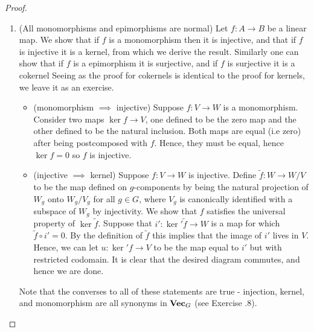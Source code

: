 \documentclass{article}
\theoremstyle{definition}
\numberwithin{figure}{section}
\begin{document}
\begin{proof}
\begin{enumerate}
\item (All monomorphisms and epimorphisms are normal) Let $f:A\to B$ be a linear map. We show that if $f$ is a monomorphism then it is injective, and that if $f$ is injective it is a kernel, from which we derive the result. Similarly one can show that if $f$ is a epimorphism it is surjective, and if $f$ is surjective it is a cokernel Seeing as the proof for cokernels is identical to the proof for kernels, we leave it as an exercise.

\begin{itemize}
\item (monomorphism $\implies$ injective) Suppose $f:V\to W$ is a monomorphism. Consider two maps $\ker f\to V$, one defined to be the zero map and the other defined to be the natural inclusion. Both maps are equal (i.e zero) after being postcomposed with $f$. Hence, they must be equal, hence $\ker f =0$ so $f$ is injective.

\item (injective $\implies$ kernel) Suppose $f: V\to W$ is injective. Define $\tilde{f}: W\to W/V$ to be the map defined on $g$-components by being the natural projection of $W_g$ onto $W_g/V_g$ for all $g\in G$, where $V_g$ is canonically identified with a subspace of $W_g$ by injectivity. We show that $f$ satisfies the universal property of $\ker \tilde{f}$. Suppose that $i':\ker' \tilde{f}\to W$ is a map for which $\tilde{f}\circ i'=0$. By the definition of $\tilde{f}$ this implies that the image of $i'$ lives in $V$. Hence, we can let $u: \ker' f\to V$ to be the map equal to $i'$ but with restricted codomain. It is clear that the desired diagram commutes, and hence we are done.
\end{itemize}

Note that the converses to all of these statements are true - injection, kernel, and monomorphism are all synonyms in $\bold{Vec}_G$ (see Exercise \thesection.8).
\end{enumerate}
\end{proof}
\end{document}
